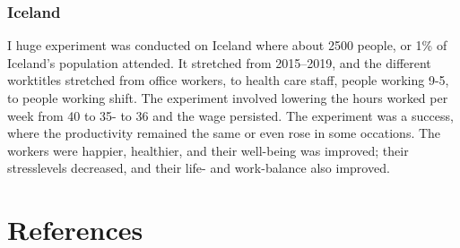 \documentclass[12pt, a4paper]{article}
\begin{document}
    \subsubsection{Iceland}
I huge experiment was conducted on Iceland where about 2500 people, or 1\% of Iceland's population attended.\cite{iceland} It stretched from 2015--2019, and the different worktitles stretched from office workers, to health care staff, people working 9-5, to people working shift. The experiment involved lowering the hours worked per week from 40 to 35- to 36 and the wage persisted. The experiment was a success, where the productivity remained the same or even rose in some occations. The workers were happier, healthier, and their well-being was improved; their stresslevels decreased, and their life- and work-balance also improved.

    \section*{References}
    \begin{multicols}{2}
        \small
        \renewcommand{\refname}{\vspace{-\baselineskip}\vspace{-1.2mm}}
        
        
    \end{multicols}
  
\end{document}
